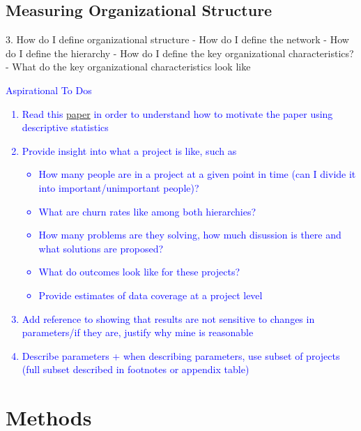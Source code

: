 \documentclass[12pt,notitlepage]{article}
\begin{document}
\subsection{Measuring Organizational Structure}
3. How do I define organizational structure
- How do I define the network
- How do I define the hierarchy
- How do I define the key organizational characteristics?
- What do the key organizational characteristics look like




\textcolor{blue}{Aspirational To Dos
\begin{enumerate}
    \item Read this  \href{https://pubs.aeaweb.org/doi/pdfplus/10.1257/jep.36.3.211}{paper} in order to understand how to motivate the paper using descriptive statistics
    \item Provide insight into what a project is like, such as
    \begin{itemize}
        \item How many people are in a project at a given point in time (can I divide it into important/unimportant people)?
        \item What are churn rates like among both hierarchies?
        \item How many problems are they solving, how much disussion is there and what solutions are proposed?
        \item What do outcomes look like for these projects?
        \item Provide estimates of data coverage at a project level 
    \end{itemize}
    \item Add reference to showing that results are not sensitive to changes in parameters/if they are, justify why mine is reasonable 
    \item Describe parameters + when describing parameters, use subset of projects (full subset described in footnotes or appendix table)
\end{enumerate}}



\section{Methods} \label{sec:method}
\end{document}
